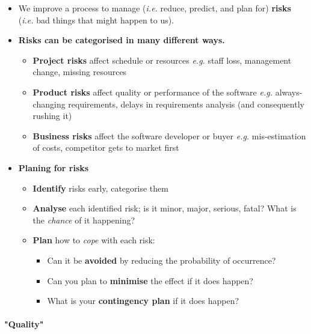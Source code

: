 \documentclass[a4paper]{article}
\providecommand{\tightlist}{%
  \setlength{\itemsep}{0pt}\setlength{\parskip}{0pt}}
\let\oldparagraph\paragraph
\renewcommand{\paragraph}[1]{\oldparagraph{#1}\mbox{}}
\begin{document}
\begin{itemize}
\tightlist
\item
  We improve a process to manage (\emph{i.e.} reduce, predict, and plan
  for) \textbf{risks} (\emph{i.e.} bad things that might happen to us).
\item
  \textbf{Risks can be categorised in many different ways.}

  \begin{itemize}
  \tightlist
  \item
    \textbf{Project risks} affect schedule or resources \emph{e.g.}
    staff loss, management change, missing resources
  \item
    \textbf{Product risks} affect quality or performance of the software
    \emph{e.g.} always-changing requirements, delays in requirements
    analysis (and consequently rushing it)
  \item
    \textbf{Business risks} affect the software developer or buyer
    \emph{e.g.} mis-estimation of costs, competitor gets to market first
  \end{itemize}
\item
  \textbf{Planing for risks}

  \begin{itemize}
  \tightlist
  \item
    \textbf{Identify} risks early, categorise them
  \item
    \textbf{Analyse} each identified risk; is it minor, major, serious,
    fatal? What is the \emph{chance} of it happening?
  \item
    \textbf{Plan} how to \emph{cope} with each risk:

    \begin{itemize}
    \tightlist
    \item
      Can it be \textbf{avoided} by reducing the probability of
      occurrence?
    \item
      Can you plan to \textbf{minimise} the effect if it does happen?
    \item
      What is your \textbf{contingency plan} if it does happen?
    \end{itemize}
  \end{itemize}
\end{itemize}

\hypertarget{quality}{%
\paragraph{"Quality"}\label{quality}}
\end{document}
